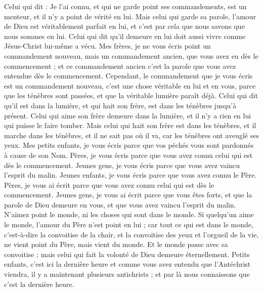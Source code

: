 \begin{multicols}{2}
Celui qui dit : Je l'ai connu, et qui ne garde point ses commandements, est un menteur, et il n'y a point de vérité en lui.
Mais celui qui garde sa parole, l'amour de Dieu est véritablement parfait en lui, et c'est par cela que nous savons que nous sommes en lui.
Celui qui dit qu'il demeure en lui doit aussi vivre comme Jésus-Christ lui-même a vécu.
Mes frères, je ne vous écris point un commandement nouveau, mais un commandement ancien, que vous avez eu dès le commencement ; et ce commandement ancien c'est la parole que vous avez entendue dès le commencement.
Cependant, le commandement que je vous écris est un commandement nouveau, c'est une chose véritable en lui et en vous, parce que les ténèbres sont passées, et que la véritable lumière paraît déjà.
Celui qui dit qu'il est dans la lumière, et qui hait son frère, est dans les ténèbres jusqu'à présent.
Celui qui aime son frère demeure dans la lumière, et il n'y a rien en lui qui puisse le faire tomber.
Mais celui qui hait son frère est dans les ténèbres, et il marche dans les ténèbres, et il ne sait pas où il va, car les ténèbres ont aveuglé ses yeux.
Mes petits enfants, je vous écris parce que vos péchés vous sont pardonnés à cause de son Nom.
Pères, je vous écris parce que vous avez connu celui qui est dès le commencement. Jeunes gens, je vous écris parce que vous avez vaincu l'esprit du malin.
Jeunes enfants, je vous écris parce que vous avez connu le Père. Pères, je vous ai écrit parce que vous avez connu celui qui est dès le commencement. Jeunes gens, je vous ai écrit parce que vous êtes forts, et que la parole de Dieu demeure en vous, et que vous avez vaincu l'esprit du malin.
N'aimez point le monde, ni les choses qui sont dans le monde. Si quelqu'un aime le monde, l'amour du Père n'est point en lui ;
car tout ce qui est dans le monde, c'est-à-dire la convoitise de la chair, et la convoitise des yeux et l'orgueil de la vie, ne vient point du Père, mais vient du monde.
Et le monde passe avec sa convoitise ; mais celui qui fait la volonté de Dieu demeure éternellement.
Petits enfants, c'est ici la dernière heure et comme vous avez entendu que l'Antéchrist viendra, il y a maintenant plusieurs antichrists ; et par là nous connaissons que c'est la dernière heure.

\end{multicols}
